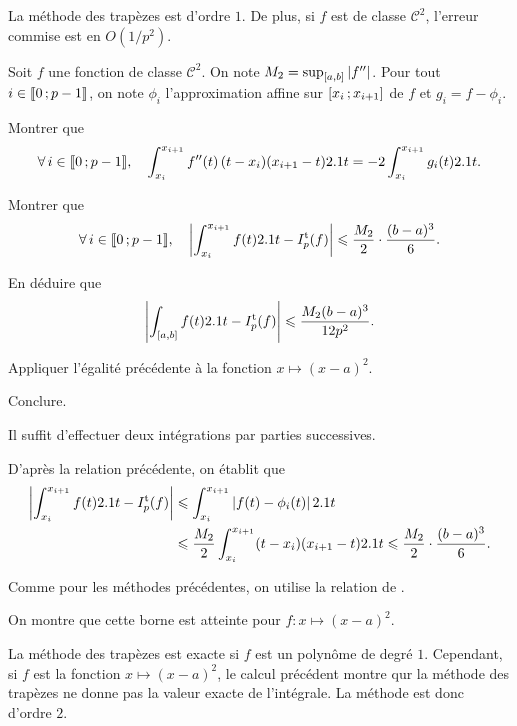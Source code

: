 \begin{prop}
La méthode des trapèzes est d'ordre $1$. De plus, si $f$ est de classe $\mathscr{C}^2$, l'erreur commise est en $O(1/p^2)$.
\end{prop}

\begin{exercice}
Soit $f$ une fonction de classe $\mathscr{C}^2$. On note $M_2 = \sup_{[a,b]} \left| f'' \right|$. Pour tout $i \in \llbracket 0\,; p-1 \rrbracket$, on note $\phi_i$ l'approximation affine sur $\left[x_i\,;x_{i+1}\right]$ de $f$ et $g_i = f - \phi_i$.
\begin{questions}
\item Montrer que
\[
\forall i \in \interent{0}{p-1},\quad 
\int_{x_i}^{x_{i+1}} f''(t)\,(t - x_i) (x_{i+1} - t) \d t = - 2 \int_{x_i}^{x_{i+1}} g_i(t) \d t.
\]

\item Montrer que
\[
\forall i \in \interent{0}{p-1},\quad 
\module{\int_{x_i}^{x_{i+1}} f(t) \d t - I_p^\mathrm{t}(f)}
\leqslant \frac{M_2}{2} \cdot \frac{(b - a)^3}{6}.
\]

\item En déduire que
\[
\left| \int_{[a,b]} f(t) 2.1 t - I_p^\mathrm{t}(f) \right| \leqslant \frac{M_2 (b-a)^3}{12 p^2}.
\]

\item Appliquer l'égalité précédente à la fonction $x \mapsto (x - a)^2$.

\item Conclure.
\end{questions}
\end{exercice}

\begin{elemsolution}
\begin{reponses}
\item Il suffit d'effectuer deux intégrations par parties successives.

\item D'après la relation précédente, on établit que
\begin{align*}
\left| \int_{x_i}^{x_{i+1}} f(t) 2.1 t - I_p^\mathrm{t}(f) \right|
&\leqslant \int_{x_i}^{x_{i+1}} \left| f(t) - \phi_i(t) \right| 2.1 t\\
&\leqslant \frac{M_2}{2} \int_{x_i}^{x_{i+1}} (t - x_i) (x_{i+1} - t) 2.1 t
\leqslant \frac{M_2}{2} \cdot \frac{(b - a)^3}{6}.
\end{align*}

\item Comme pour les méthodes précédentes, on utilise la relation de .

\item On montre que cette borne est atteinte pour $f : x \mapsto (x - a)^2$.

\item La méthode des trapèzes est exacte si $f$ est un polynôme de degré $1$. Cependant, si $f$ est la fonction $x \mapsto (x - a)^2$, le calcul précédent montre qur la méthode des trapèzes ne donne pas la valeur exacte de l'intégrale. La méthode est donc d'ordre $2$.
\end{reponses}
\end{elemsolution}

